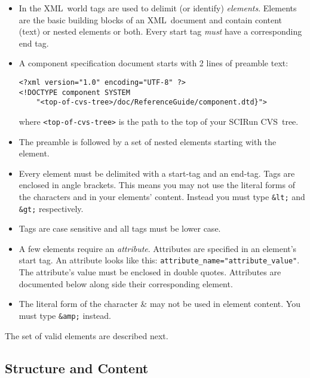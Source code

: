 \documentclass{article}
\newcommand{\ab}[1]{\latexhtml{$<$#1$>$}{<#1>}}
\newcommand{\la}{\latexhtml{$<$}{<}}
\newcommand{\ra}{\latexhtml{$>$}{>}}
\newcommand{\acronym}[1]{#1}
\newcommand{\dfn}[1]{\emph{#1}}
\newcommand{\filename}[1]{\texttt{#1}}
\newcommand{\xml}{\acronym{XML}}
\newcommand{\cvs}{\acronym{CVS}}
\newcommand{\element}[1]{\ab{\texttt{#1}}}
\newcommand{\keyboard}[1]{\texttt{#1}}
\newcommand{\icode}[1]{\texttt{#1}}
\newcommand{\SUBSECstructContent}{Structure and Content}
\begin{document}
\begin{itemize}
\item In the \xml\ world tags are used to delimit (or identify)
  \dfn{elements}.  Elements are the basic building blocks of an \xml\ 
  document and contain content (text) or nested elements or both.  Every
  start tag \emph{must} have a corresponding end tag.
  
\item A component specification document starts with 2 lines of preamble
  text:

\begin{verbatim}
<?xml version="1.0" encoding="UTF-8" ?>
<!DOCTYPE component SYSTEM 
    "<top-of-cvs-tree>/doc/ReferenceGuide/component.dtd}">
\end{verbatim}

where \filename{<top-of-cvs-tree>} is the path to the top of your SCIRun \cvs\
tree. 
  
\item The preamble is followed by a set of nested elements starting with
  the \element{component} element.
  
\item Every element must be delimited with a start-tag and an end-tag.
  Tags are enclosed in angle brackets.  This means you may not use the
  literal forms of the characters \keyboard{\la} and \keyboard{\ra} in your
  elements' content.  Instead you must type \keyboard{\&lt;} and
  \keyboard{\&gt;} respectively.

\item Tags are case sensitive and all tags must be lower case.
  
\item A few elements require an \dfn{attribute}.  Attributes are specified
  in an element's start tag.  An attribute looks like this:
  \icode{attribute\_name="attribute\_value"}.  The attribute's value must be
  enclosed in double quotes. Attributes are documented below along side
  their corresponding element.
  
\item The literal form of the character \& may not be used in element
  content.  You must type \keyboard{\&amp;} instead.

\end{itemize}

The set of valid elements are described next.

\subsection{\SUBSECstructContent}
\label{\SUBSECstructContent}
\end{document}

